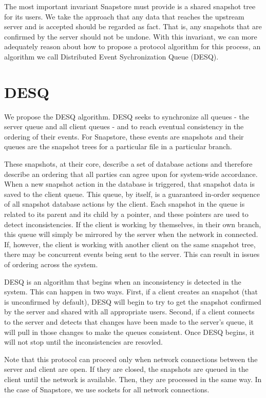 The most important invariant Snapstore must provide is a shared snapshot tree for its users. We take the approach that any data that reaches the upstream server and is accepted should be regarded as fact. That is, any snapshots that are confirmed by the server should not be undone. With this invariant, we can more adequately reason about how to propose a protocol algorithm for this process, an algorithm we call Distributed Event Sychronization Queue (DESQ).

\section{DESQ} 

We propose the DESQ algorithm. DESQ seeks to synchronize all queues - the server queue and all client queues - and to reach eventual consistency in the ordering of their events. For Snapstore, these events are snapshots and their queues are the snapshot trees for a particular file in a particular branch. 

These snapshots, at their core, describe a set of database actions and therefore describe an ordering that all parties can agree upon for system-wide accordance. When a new snapshot action in the database is triggered, that snapshot data is saved to the client queue. This queue, by itself, is a guaranteed in-order sequence of all snapshot database actions by the client. Each snapshot in the queue is related to its parent and its child by a pointer, and these pointers are used to detect inconsistencies. If the client is working by themselves, in their own branch, this queue will simply be mirrored by the server when the network in connected. If, however, the client is working with another client on the same snapshot tree, there may be concurrent events being sent to the server. This can result in issues of ordering across the system.

DESQ is an algorithm that begins when an inconsistency is detected in the system. This can happen in two ways. First, if a client creates an snapshot (that is unconfirmed by default), DESQ will begin to try to get the snapshot confirmed by the server and shared with all appropriate users. Second, if a client connects to the server and detects that changes have been made to the server's queue, it will pull in those changes to make the queues consistent. Once DESQ begins, it will not stop until the inconsistencies are resovled. 

Note that this protocol can proceed only when network connections between the server and client are open. If they are closed, the snapshots are queued in the client until the network is available. Then, they are processed in the same way. In the case of Snapstore, we use sockets for all network connections.

